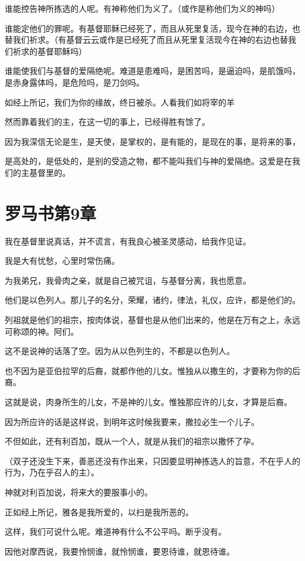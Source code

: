 \documentclass[12pt,oneside]{book}
\begin{document}
谁能控告神所拣选的人呢。有神称他们为义了。（或作是称他们为义的神吗）

谁能定他们的罪呢。有基督耶稣已经死了，而且从死里复活，现今在神的右边，也替我们祈求。（有基督云云或作是已经死了而且从死里复活现今在神的右边也替我们祈求的基督耶稣吗）

谁能使我们与基督的爱隔绝呢。难道是患难吗，是困苦吗，是逼迫吗，是肌饿吗，是赤身露体吗，是危险吗，是刀剑吗。

如经上所记，我们为你的缘故，终日被杀。人看我们如将宰的羊

然而靠着我们的主，在这一切的事上，已经得胜有馀了。

因为我深信无论是生，是天使，是掌权的，是有能的，是现在的事，是将来的事，

是高处的，是低处的，是别的受造之物，都不能叫我们与神的爱隔绝。这爱是在我们的主基督里的。

\chapter{罗马书第9章}
我在基督里说真话，并不谎言，有我良心被圣灵感动，给我作见证。

我是大有忧愁，心里时常伤痛。

为我弟兄，我骨肉之亲，就是自己被咒诅，与基督分离，我也愿意。

他们是以色列人。那儿子的名分，荣耀，诸约，律法，礼仪，应许，都是他们的。

列祖就是他们的祖宗，按肉体说，基督也是从他们出来的，他是在万有之上，永远可称颂的神。阿们。

这不是说神的话落了空。因为从以色列生的，不都是以色列人。

也不因为是亚伯拉罕的后裔，就都作他的儿女。惟独从以撒生的，才要称为你的后裔。

这就是说，肉身所生的儿女，不是神的儿女。惟独那应许的儿女，才算是后裔。

因为所应许的话是这样说，到明年这时候我要来，撒拉必生一个儿子。

不但如此，还有利百加，既从一个人，就是从我们的祖宗以撒怀了孕。

（双子还没生下来，善恶还没有作出来，只因要显明神拣选人的旨意，不在乎人的行为，乃在乎召人的主）。

神就对利百加说，将来大的要服事小的。

正如经上所记，雅各是我所爱的，以扫是我所恶的。

这样，我们可说什么呢。难道神有什么不公平吗。断乎没有。

因他对摩西说，我要怜悯谁，就怜悯谁，要恩待谁，就恩待谁。
\end{document}
